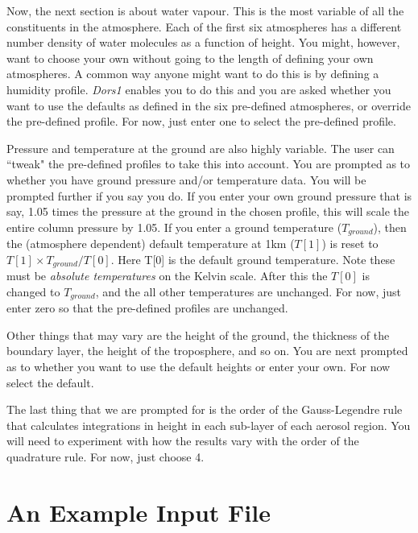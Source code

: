 \documentclass[12pt]{article}
\begin{document}
Now, the next section is about water vapour. This is the most variable of all the
constituents in the atmosphere.  Each of the first six atmospheres has a different number
density of water molecules as a function of height. You might, however, want to choose your
own without going to the length of defining your own atmospheres.  A common way anyone
might want to do this is by defining a humidity profile. {\it Dors1} enables you to do 
this and you are asked whether you want to use the defaults as defined in the six pre-defined
atmospheres, or override the pre-defined profile. For now, just enter one to select the
pre-defined profile.

Pressure and temperature at the ground are also highly variable. The user can ``tweak" the
pre-defined profiles to take this into account. You are prompted as to whether you have ground pressure
and/or temperature data. You will be prompted further if you say you do. If you enter
your own ground pressure that is say, 1.05 times the pressure at the ground
in the chosen profile, this will scale the entire column pressure by 1.05. If you enter a ground
temperature ($T_{ground}$), then  the (atmosphere dependent) default  
temperature at 1km ($T[1]$) is reset to $T[1]\times T_{ground}/T[0]$. Here
 T[0] is the default ground temperature. Note these must be {\it absolute temperatures} on the Kelvin scale.
 After this the $T[0]$ is changed to $T_{ground}$, and the all other temperatures are unchanged. For now, just
enter zero so that the pre-defined profiles are unchanged.

Other things that may vary are the height of the ground, the thickness of the boundary layer,
 the height of the troposphere, and so on. You are next prompted as to whether you want to
use the default heights or enter your own. For now select the default.

The last thing that we are prompted for is the order of the 
 Gauss-Legendre rule that calculates integrations in height in each sub-layer of each
aerosol region. 
You will need to experiment with how the results vary with the order of the quadrature rule. For now, just choose 4.

\section{An Example Input File}
\end{document}
